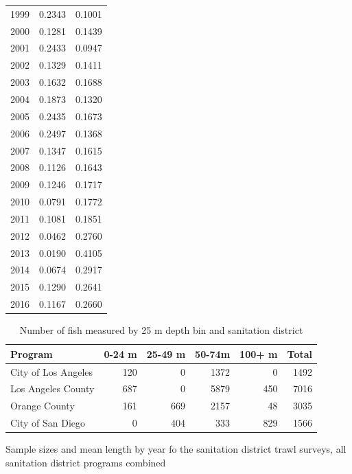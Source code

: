\documentclass[12pt,]{article}
\begin{document}
\begin{table}[ht]
{\begin{tabular}{rrr}
   1999 & 0.2343 & 0.1001 \\ 
   2000 & 0.1281 & 0.1439 \\ 
   2001 & 0.2433 & 0.0947 \\ 
   2002 & 0.1329 & 0.1411 \\ 
   2003 & 0.1632 & 0.1688 \\ 
   2004 & 0.1873 & 0.1320 \\ 
   2005 & 0.2435 & 0.1673 \\ 
   2006 & 0.2497 & 0.1368 \\ 
   2007 & 0.1347 & 0.1615 \\ 
   2008 & 0.1126 & 0.1643 \\ 
   2009 & 0.1246 & 0.1717 \\ 
   2010 & 0.0791 & 0.1772 \\ 
   2011 & 0.1081 & 0.1851 \\ 
   2012 & 0.0462 & 0.2760 \\ 
   2013 & 0.0190 & 0.4105 \\ 
   2014 & 0.0674 & 0.2917 \\ 
   2015 & 0.1290 & 0.2641 \\ 
   2016 & 0.1167 & 0.2660 \\ 
   \hline
\end{tabular}
}
\end{table}\begin{table}[ht]
\centering
\caption{Number of fish measured by 25 m 
                                              depth bin and sanitation district } 
\label{tab:Fleet7_lengthdepth}
\begin{tabular}{lrrrrr}
  \hline
Program & 0-24 m & 25-49 m & 50-74m & 100+ m & Total \\ 
  \hline
City of Los Angeles & 120 &   0 & 1372 &   0 & 1492 \\ 
  Los Angeles County & 687 &   0 & 5879 & 450 & 7016 \\ 
  Orange County & 161 & 669 & 2157 &  48 & 3035 \\ 
  City of San Diego &   0 & 404 & 333 & 829 & 1566 \\ 
   \hline
\end{tabular}
\end{table}\begin{table}[ht]
\centering
\caption{Sample sizes and mean length by
                                                year fo the sanitation district 
                                                trawl surveys, all sanitation 
                                              district programs combined} 

\end{table}
\end{document}
